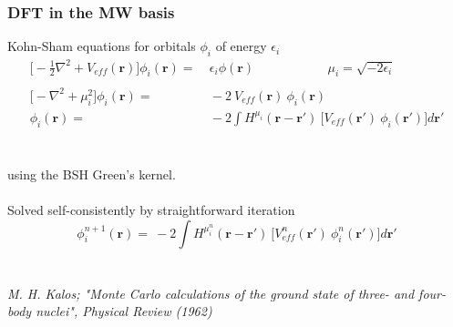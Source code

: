 \documentclass[slides]{beamer}
\begin{document}
\begin{frame}
	\frametitle{DFT in the MW basis}
	Kohn-Sham equations for orbitals $\phi_i$ of energy $\epsilon_i$
	\begin{align}
		\nonumber
		\big[-\frac{1}{2}\nabla^2 + V_{eff}(\boldsymbol{r})\big]
		\phi_i(\boldsymbol{r}) =&\ \epsilon_i \phi(\boldsymbol{r})\ \ \ \ \ \ \ \ \ \ \ \ 
		\ \ \ \ \ \ \ \ \ \ \ \ \ \ \mu_i = \sqrt{-2\epsilon_i}\\
		\nonumber
		\ & \ \\
		\nonumber
		\big[-\nabla^2 + \mu_i^2\big]\phi_i(\boldsymbol{r}) =&\ 
		    -2\ V_{eff}(\boldsymbol{r})\ \phi_i(\boldsymbol{r})\\
		\nonumber
		\phi_i(\boldsymbol{r}) =&\ -2\int H^{\mu_i}(\boldsymbol{r}-\boldsymbol{r}')\
		    \Big[V_{eff}(\boldsymbol{r}')\ \phi_i(\boldsymbol{r}')\Big] d\boldsymbol{r}'
	\end{align}
	\ \\
	\ \\
	using the BSH Green's kernel.\\
	\ \\
	\pause
	Solved self-consistently by straightforward iteration\\
	\begin{equation}
	    \nonumber
	    \phi^{n+1}_i(\boldsymbol{r}) =\ -2\int H^{\mu^n_i}(\boldsymbol{r}-\boldsymbol{r}')\
		\Big[V^n_{eff}(\boldsymbol{r}')\ \phi^n_i(\boldsymbol{r}')\Big] d\boldsymbol{r}'
	\end{equation}
	\ \\
	\ \\
	\tiny \it{M. H. Kalos; "Monte Carlo calculations of the ground state of three- and 
	    four-body nuclei", Physical Review (1962)}
\end{frame}
\end{document}
